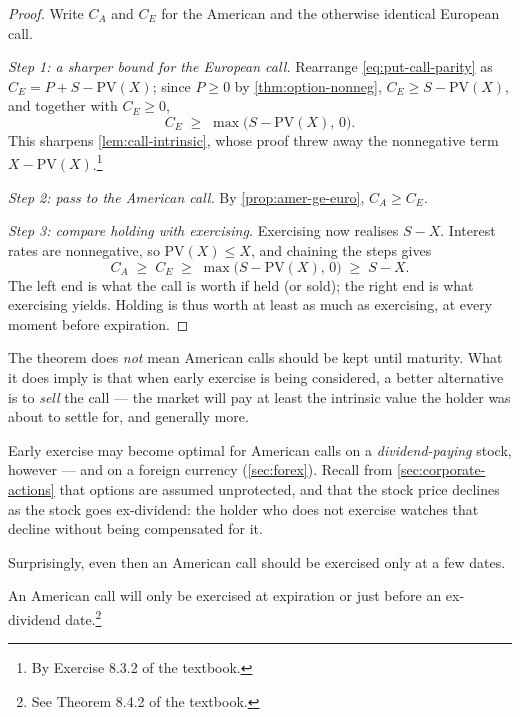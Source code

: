 \begin{proof}
	Write $C_{A}$ and $C_{E}$ for the American and the otherwise identical European call.

	\emph{Step 1: a sharper bound for the European call.}
	Rearrange \eqref{eq:put-call-parity} as $C_{E}=P+S-\mathrm{PV}(X)$; since $P\ge 0$ by \autoref{thm:option-nonneg}, $C_{E}\ge S-\mathrm{PV}(X)$, and together with $C_{E}\ge 0$,
	\[
		C_{E} \;\ge\; \max\bigl(S-\mathrm{PV}(X),\,0\bigr) .
	\]
	This sharpens \autoref{lem:call-intrinsic}, whose proof threw away the nonnegative term $X-\mathrm{PV}(X)$.\footnote{By Exercise 8.3.2 of the textbook.}

	\emph{Step 2: pass to the American call.}
	By \autoref{prop:amer-ge-euro}, $C_{A}\ge C_{E}$.

	\emph{Step 3: compare holding with exercising.}
	Exercising now realises $S-X$. Interest rates are nonnegative, so $\mathrm{PV}(X)\le X$, and chaining the steps gives
	\[
		C_{A} \;\ge\; C_{E} \;\ge\; \max\bigl(S-\mathrm{PV}(X),\,0\bigr) \;\ge\; S-X .
	\]
	The left end is what the call is worth if held (or sold); the right end is what exercising yields.
	Holding is thus worth at least as much as exercising, at every moment before expiration.
\end{proof}

\begin{remark}
	The theorem does \emph{not} mean American calls should be kept until maturity.
	What it does imply is that when early exercise is being considered, a better alternative is to \emph{sell} the call --- the market will pay at least the intrinsic value the holder was about to settle for, and generally more.

	Early exercise may become optimal for American calls on a \emph{dividend-paying} stock, however --- and on a foreign currency (\autoref{sec:forex}).
	Recall from \autoref{sec:corporate-actions} that options are assumed unprotected, and that the stock price declines as the stock goes ex-dividend: the holder who does not exercise watches that decline without being compensated for it.
\end{remark}


Surprisingly, even then an American call should be exercised only at a few dates.

\begin{theorem}[Merton, 1973]
	\label{thm:merton-dividend}
	An American call will only be exercised at expiration or just before an ex-dividend date.\footnote{See Theorem 8.4.2 of the textbook.}
\end{theorem}

